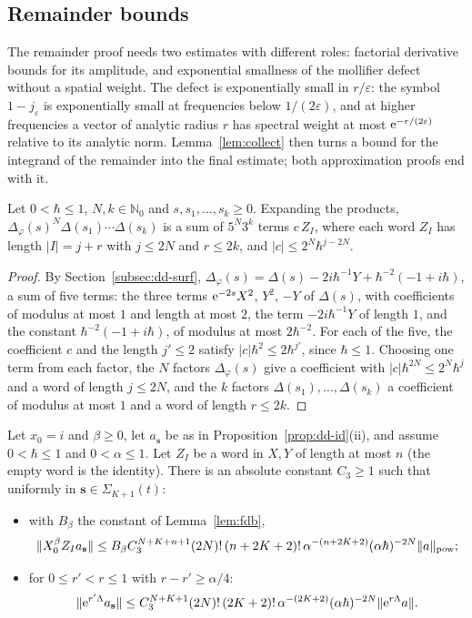 \subsection{Remainder bounds}\label{subsec:dd-wb}
The remainder proof needs two estimates with different roles: factorial derivative bounds for its
amplitude, and exponential smallness of the mollifier defect without a spatial weight. The defect is exponentially
small in $r/\varepsilon$: the symbol $1-j_\varepsilon$ is exponentially small at frequencies below $1/(2\varepsilon)$, and at higher
frequencies a vector of analytic radius $r$ has spectral weight at most $\mathrm{e}^{-r/(2\varepsilon)}$ relative to its analytic norm. Lemma~\ref{lem:collect} then turns a
bound for the integrand of the remainder into the final estimate; both approximation proofs end with it.

\begin{lemma}\label{lem:expand}
Let $0<\hbar\le1$, $N,k\in\mathbb N_0$ and $s,s_1,\dots,s_k\ge0$. Expanding the products,
$\Delta_\varphi(s)^N\Delta(s_1)\cdots\Delta(s_k)$ is a sum of $5^N3^k$ terms $c\,Z_I$, where each word $Z_I$ has length
$|I|=j+r$ with $j\le2N$ and $r\le2k$, and $|c|\le2^N\hbar^{j-2N}$.
\end{lemma}

\begin{proof}
By Section~\ref{subsec:dd-surf}, $\Delta_\varphi(s)=\Delta(s)-2i\hbar^{-1}Y+\hbar^{-2}(-1+i\hbar)$, a sum of five terms: the three
terms $\mathrm{e}^{-2s}X^2$, $Y^2$, $-Y$ of $\Delta(s)$, with coefficients of modulus at most $1$ and length at most $2$, the term
$-2i\hbar^{-1}Y$ of length $1$, and the constant $\hbar^{-2}(-1+i\hbar)$, of modulus at most $2\hbar^{-2}$. For each of the five,
the coefficient $c$ and the length $j'\le2$ satisfy $|c|\hbar^2\le2\hbar^{j'}$, since $\hbar\le1$. Choosing one term from each
factor, the $N$ factors $\Delta_\varphi(s)$ give a coefficient with $|c|\hbar^{2N}\le2^N\hbar^j$ and a word of length
$j\le2N$, and the $k$ factors $\Delta(s_1),\dots,\Delta(s_k)$ a coefficient of modulus at most $1$ and a word of length $r\le2k$.
\end{proof}

\begin{lemma}\label{lem:wb}
Let $x_0=i$ and $\beta\ge0$, let $a_{\mathbf s}$ be as in Proposition~\ref{prop:dd-id}(ii), and assume $0<\hbar\le1$ and $0<\alpha\le1$. Let $Z_I$ be
a word in $X,Y$ of length at most $n$ (the empty word is the identity). There is an absolute constant $C_3\ge1$ such that
uniformly in $\mathbf s\in\Sigma_{K+1}(t)$:
\begin{itemize}
\item[\textup{(i)}] with $B_\beta$ the constant of Lemma~\ref{lem:fdb},
\[
\lVert X_0^\beta Z_Ia_{\mathbf s}\rVert\le B_\beta C_3^{N+K+n+1}(2N)!\,(n+2K+2)!\,\alpha^{-(n+2K+2)}(\alpha\hbar)^{-2N}\lVert a\rVert_{\mathrm{pow}} ;
\]
\item[\textup{(ii)}] for $0\le r'<r\le1$ with $r-r'\ge\alpha/4$:
\[
\lVert \mathrm{e}^{r'\Lambda}a_{\mathbf s}\rVert\le C_3^{N+K+1}(2N)!\,(2K+2)!\,\alpha^{-(2K+2)}(\alpha\hbar)^{-2N}\lVert \mathrm{e}^{r\Lambda}a\rVert.
\]
\end{itemize}
\end{lemma}

